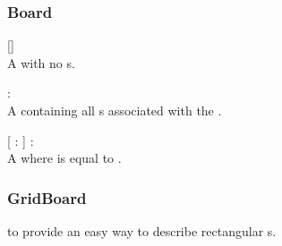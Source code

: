 \subsubsection{Board}
\begin{dlist}
  \item {}[]\\
  A  with no s.
  
  \item {} : \\
  A  containing all s associated with the .
  
  \item {}[  :  ] : \\
  A  where  is equal to .
\end{dlist}

\subsubsection{GridBoard}
   to provide an easy way to describe rectangular s.

